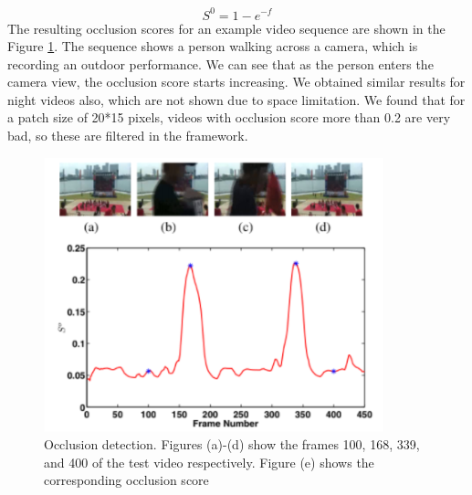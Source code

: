 \documentclass{sig-alternate}
\begin{document}
\begin{equation}
    S^0=1-e^{-f}
\end{equation}
The resulting occlusion scores for an example video sequence are shown in the Figure \ref{fig:fig3}. The sequence shows a person walking across a camera, which is recording an outdoor performance. We can see that as the person enters the camera view, the occlusion score starts increasing. We obtained similar results for night videos also, which are not shown due to space limitation. We found that for a patch size of 20*15 pixels, videos with occlusion score more than 0.2 are very bad, so these are filtered in the framework.

\begin{figure}
    \centering
    \includegraphics{img3.png}
    \caption{Occlusion detection. Figures (a)-(d) show the frames
100, 168, 339, and 400 of the test video respectively. Figure (e)
shows the corresponding occlusion score}
    \label{fig:fig3}
\end{figure}
\end{document}
